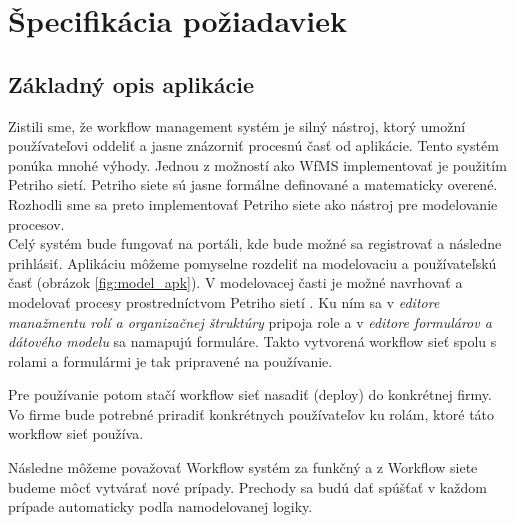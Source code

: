 


\section{Špecifikácia požiadaviek}

\subsection{Základný opis aplikácie}
Zistili sme, že workflow management systém je silný nástroj, ktorý umožní používateľovi oddeliť a jasne znázorniť procesnú časť od aplikácie. Tento systém ponúka mnohé výhody. Jednou z možností ako WfMS implementovať je použitím Petriho sietí. Petriho siete sú jasne formálne definované a matematicky overené.  Rozhodli sme sa preto implementovať Petriho siete ako nástroj pre modelovanie procesov.\\

Celý systém bude fungovať na portáli, kde bude možné sa registrovať a následne prihlásiť. Aplikáciu môžeme pomyselne rozdeliť na modelovaciu a používateľskú časť (obrázok \ref{fig:model_apk}). V modelovacej časti je možné navrhovať a modelovať procesy prostredníctvom Petriho sietí . Ku ním sa v \emph{editore manažmentu rolí a organizačnej štruktúry} pripoja role a v \emph{editore formulárov a dátového modelu} sa namapujú formuláre. Takto vytvorená workflow sieť spolu s rolami a formulármi je tak pripravené na používanie. 

Pre používanie potom stačí workflow sieť nasadiť (deploy) do konkrétnej firmy. Vo firme bude potrebné priradiť konkrétnych používateľov ku rolám, ktoré táto workflow sieť používa.

Následne môžeme považovať Workflow systém za funkčný a z Workflow siete budeme môcť vytvárať nové prípady. Prechody sa budú dať spúšťať v každom prípade  automaticky podľa namodelovanej logiky.


